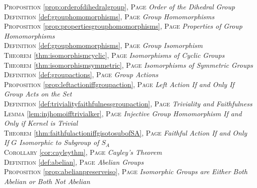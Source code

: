 \begin{multicols}{2}
{\textsc{Proposition} \ref{prop:orderofdihedralgroup}, \textsc{Page} \pageref{prop:orderofdihedralgroup} \textit{Order of the Dihedral Group} \\
\textsc{Definition} \ref{def:grouphomomorphisms}, \textsc{Page} \pageref{def:grouphomomorphisms} \textit{Group Homomorphisms} \\
\textsc{Proposition} \ref{prop:propertiesgrouphomomorphisms}, \textsc{Page} \pageref{prop:propertiesgrouphomomorphisms} \textit{Properties of Group Homomorphisms} \\
\textsc{Definition} \ref{def:grouphomomorphisms}, \textsc{Page} \pageref{def:grouphomomorphisms} \textit{Group Isomorphism} \\
\textsc{Theorem} \ref{thm:isomorphismcyclic}, \textsc{Page} \pageref{thm:isomorphismcyclic} \textit{Isomorphisms of Cyclic Groups} \\
\textsc{Theorem} \ref{thm:isomorphismsymmetric}, \textsc{Page} \pageref{thm:isomorphismsymmetric} \textit{Isomorphisms of Symmetric Groups} \\
\textsc{Definition} \ref{def:groupactions}, \textsc{Page} \pageref{def:groupactions} \textit{Group Actions} \\
\textsc{Proposition} \ref{prop:leftactioniffgroupaction}, \textsc{Page} \pageref{prop:leftactioniffgroupaction} \textit{Left Action If and Only If Group Acts on the Set} \\
\textsc{Definition} \ref{def:trivialityfaithfulnessgroupaction}, \textsc{Page} \pageref{def:trivialityfaithfulnessgroupaction} \textit{Triviality and Faithfulness} \\
\textsc{Lemma} \ref{lem:injhomoifftrivialker}, \textsc{Page} \pageref{lem:injhomoifftrivialker} \textit{Injective Group Homomorphism If and Only if Kernel is Trivial} \\
\textsc{Theorem} \ref{thm:faithfulactioniffgisotosubofSA}, \textsc{Page} \pageref{thm:faithfulactioniffgisotosubofSA} \textit{Faithful Action If and Only If \(G\) Isomorphic to Subgroup of \(S_A\)} \\
\textsc{Corollary} \ref{cor:cayleythm}, \textsc{Page} \pageref{cor:cayleythm} \textit{Cayley's Theorem} \\
\textsc{Definition} \ref{def:abelian}, \textsc{Page} \pageref{def:abelian} \textit{Abelian Groups} \\
\textsc{Proposition} \ref{prop:abelianpreserveiso}, \textsc{Page} \pageref{prop:abelianpreserveiso} \textit{Isomorphic Groups are Either Both Abelian or Both Not Abelian} \\
}
\end{multicols}
